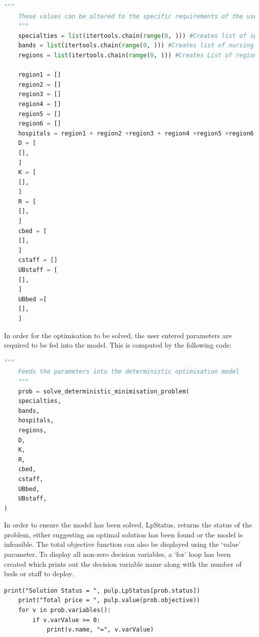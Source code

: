 \documentclass[../thesis.tex]{subfiles}
\begin{document}
\begin{lstlisting}[language= python]
    """
    These values can be altered to the specific requirements of the user
    """
    specialties = list(itertools.chain(range(0, ))) #Creates list of specialties
    bands = list(itertools.chain(range(0, ))) #Creates list of nursing bands
    regions = list(itertools.chain(range(0, ))) #Creates List of regions

    region1 = []
    region2 = []
    region3 = []
    region4 = []
    region5 = []
    region6 = []
    hospitals = region1 + region2 +region3 + region4 +region5 +region6
    D = [ 
    [],
    ]
    K = [
    [],
    ]
    R = [
    [],
    ] 
    cbed = [
    [],
    ]
    cstaff = []
    UBstaff = [
    [],
    ]
    UBbed =[
    [],
    ]
\end{lstlisting}

In order for the optimisation to be solved, the user entered parameters are required to be fed into the model. This is computed by the following code:
\begin{lstlisting}[language=python]
    """
    Feeds the parameters into the deterministic optimisation model
    """
    prob = solve_deterministic_minimisation_problem(
    specialties,
    bands,
    hospitals,
    regions,
    D,
    K,
    R,
    cbed,
    cstaff,
    UBbed,
    UBstaff,
)
\end{lstlisting}
In order to ensure the model has been solved, LpStatus, returns the status of the problem, either suggesting an optimal solution has been found or the model is infeasible. The total objective function can also be displayed using the `value' parameter. To display all non-zero decision variables, a `for' loop has been created which prints out the decision variable name along with the number of beds or staff to deploy.

\begin{lstlisting}[langauge=python]
    print("Solution Status = ", pulp.LpStatus[prob.status])
    print("Total price = ", pulp.value(prob.objective))  
    for v in prob.variables():
        if v.varValue >= 0:
            print(v.name, "=", v.varValue)
\end{lstlisting}
\end{document}
